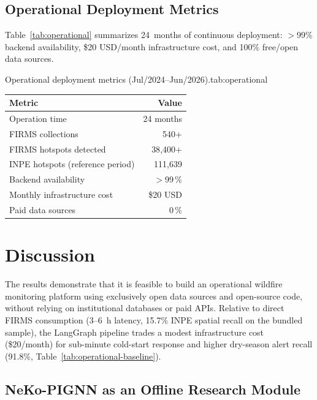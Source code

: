\documentclass[preprint,12pt,times,numbers]{elsarticle}
\begin{document}
\subsection{Operational Deployment Metrics}
\label{sec:operational-perf}

Table~\ref{tab:operational} summarizes 24~months of continuous deployment: $>$99\% backend availability, \$20 USD/month infrastructure cost, and 100\% free/open data sources.

\begin{resulttable}{Operational deployment metrics (Jul/2024--Jun/2026).}{tab:operational}
\begin{tabular}{@{}lr@{}}
\toprule
\textbf{Metric} & \textbf{Value} \\
\midrule
Operation time & 24 months \\
FIRMS collections & 540+ \\
FIRMS hotspots detected & 38{,}400+ \\
INPE hotspots (reference period) & 111{,}639 \\
Backend availability & $>$99\,\% \\
Monthly infrastructure cost & \$20 USD \\
Paid data sources & 0\,\% \\
\bottomrule
\end{tabular}
\end{resulttable}

\section{Discussion}
\label{sec:discussion}

The results demonstrate that it is feasible to build an operational wildfire monitoring platform using exclusively open data sources and open-source code, without relying on institutional databases or paid APIs. Relative to direct FIRMS consumption (3--6~h latency, 15.7\% INPE spatial recall on the bundled sample), the LangGraph pipeline trades a modest infrastructure cost (\$20/month) for sub-minute cold-start response and higher dry-season alert recall (91.8\%, Table~\ref{tab:operational-baseline}).

\subsection{NeKo-PIGNN as an Offline Research Module}
\end{document}
